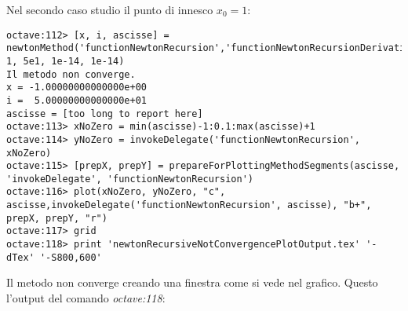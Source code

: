 Nel secondo caso studio il punto di innesco $x_{0} = 1$:
\begin{lstlisting}
octave:112> [x, i, ascisse] = newtonMethod('functionNewtonRecursion','functionNewtonRecursionDerivative', 1, 5e1, 1e-14, 1e-14)
Il metodo non converge.
x = -1.00000000000000e+00
i =  5.00000000000000e+01
ascisse = [too long to report here]
octave:113> xNoZero = min(ascisse)-1:0.1:max(ascisse)+1
octave:114> yNoZero = invokeDelegate('functionNewtonRecursion', xNoZero)
octave:115> [prepX, prepY] = prepareForPlottingMethodSegments(ascisse, 'invokeDelegate', 'functionNewtonRecursion')
octave:116> plot(xNoZero, yNoZero, "c", ascisse,invokeDelegate('functionNewtonRecursion', ascisse), "b+", prepX, prepY, "r")
octave:117> grid
octave:118> print 'newtonRecursiveNotConvergencePlotOutput.tex' '-dTex' '-S800,600'
\end{lstlisting}
Il metodo non converge creando una finestra come si vede nel grafico. Questo
l'output del comando \emph{octave:118}:
\begin{center}

\end{center}